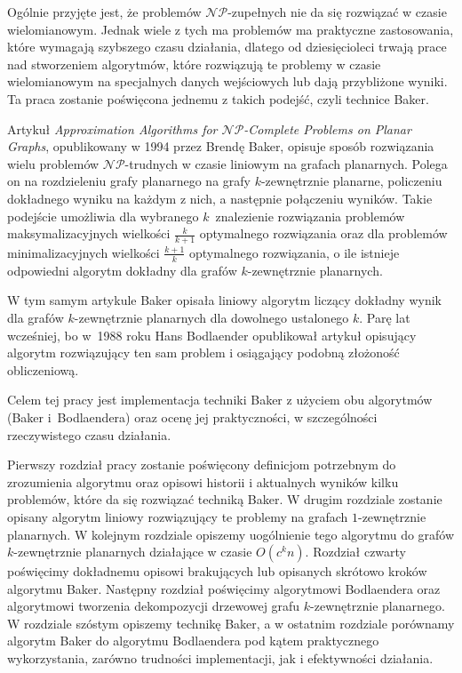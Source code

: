 \documentclass[twoside,a4paper,12pt]{report} %
\theoremstyle{break}
\begin{document}
Ogólnie przyjęte jest, że problemów $\mathcal{NP}$-zupełnych nie da się rozwiązać w czasie wielomianowym. Jednak wiele z tych ma problemów ma praktyczne zastosowania, które wymagają szybszego czasu działania, dlatego od dziesięcioleci trwają prace nad stworzeniem algorytmów, które rozwiązują te problemy w czasie wielomianowym na specjalnych danych wejściowych lub dają przybliżone wyniki. Ta praca zostanie poświęcona jednemu z takich podejść, czyli technice Baker. 

Artykuł \emph{Approximation Algorithms for $\mathcal{NP}$-Complete Problems on Planar Graphs}, opublikowany w 1994 przez Brendę Baker, opisuje sposób rozwiązania wielu problemów $\mathcal{NP}$-trudnych w czasie liniowym na grafach planarnych. Polega on na rozdzieleniu grafy planarnego na grafy $k$-zewnętrznie planarne, policzeniu dokładnego wyniku na każdym z nich, a następnie połączeniu wyników. Takie podejście umożliwia dla wybranego $k$~znalezienie rozwiązania problemów maksymalizacyjnych wielkości $\frac{k}{k+1}$ optymalnego rozwiązania oraz dla problemów minimalizacyjnych wielkości $\frac{k+1}{k}$ optymalnego rozwiązania,  o ile istnieje odpowiedni algorytm dokładny dla grafów $k$-zewnętrznie planarnych.

W tym samym artykule Baker opisała liniowy algorytm liczący dokładny wynik dla grafów $k$-zewnętrznie planarnych dla dowolnego ustalonego $k$. Parę lat wcześniej, bo w~1988 roku Hans Bodlaender opublikował artykuł opisujący algorytm rozwiązujący ten sam problem i osiągający podobną złożoność obliczeniową.

Celem tej pracy jest implementacja techniki Baker z użyciem obu algorytmów (Baker i~Bodlaendera) oraz ocenę jej praktyczności, w szczególności rzeczywistego czasu działania.

Pierwszy rozdział pracy zostanie poświęcony definicjom potrzebnym do zrozumienia algorytmu oraz opisowi historii i aktualnych wyników kilku problemów, które da się rozwiązać techniką Baker. W drugim rozdziale zostanie opisany algorytm liniowy rozwiązujący te problemy na grafach $1$-zewnętrznie planarnych. W kolejnym rozdziale opiszemy uogólnienie tego algorytmu do grafów $k$-zewnętrznie planarnych działające w czasie $O(c^kn)$. Rozdział czwarty poświęcimy dokładnemu opisowi brakujących lub opisanych skrótowo kroków algorytmu Baker. Następny rozdział poświęcimy algorytmowi Bodlaendera oraz algorytmowi tworzenia dekompozycji drzewowej grafu $k$-zewnętrznie planarnego. W rozdziale szóstym opiszemy technikę Baker, a w ostatnim rozdziale porównamy algorytm Baker do algorytmu Bodlaendera pod kątem praktycznego wykorzystania, zarówno trudności implementacji, jak i efektywności działania.
\end{document}
